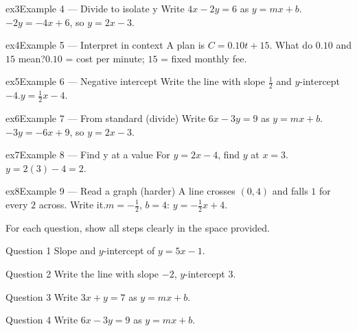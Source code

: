 \documentclass[11pt]{article}
\begin{document}
\begin{example}{ex3}{Example 4 --- Divide to isolate y}
Write $4x-2y=6$ as $y=mx+b$.\soln $-2y=-4x+6$, so $y=2x-3$.
\end{example}

\begin{example}{ex4}{Example 5 --- Interpret in context}
A plan is $C=0.10t+15$. What do $0.10$ and $15$ mean?\soln $0.10$ = cost per minute; $15$ = fixed monthly fee.
\end{example}

\begin{example}{ex5}{Example 6 --- Negative intercept}
Write the line with slope $\tfrac12$ and $y$-intercept $-4$.\soln $y=\tfrac12x-4$.
\end{example}

\begin{example}{ex6}{Example 7 --- From standard (divide)}
Write $6x-3y=9$ as $y=mx+b$.\soln $-3y=-6x+9$, so $y=2x-3$.
\end{example}

\begin{example}{ex7}{Example 8 --- Find y at a value}
For $y=2x-4$, find $y$ at $x=3$.\soln $y=2(3)-4=2$.
\end{example}

\begin{example}{ex8}{Example 9 --- Read a graph (harder)}
A line crosses $(0,4)$ and falls $1$ for every $2$ across. Write it.\soln $m=-\tfrac12$, $b=4$: $y=-\tfrac12x+4$.
\end{example}

\clearpage
{}
For each question, show all steps clearly in the space provided.

\begin{qbox}{Question 1}
Slope and $y$-intercept of $y=5x-1$.\workspace{1.8cm}
\end{qbox}

\begin{qbox}{Question 2}
Write the line with slope $-2$, $y$-intercept $3$.\workspace{1.8cm}
\end{qbox}

\begin{qbox}{Question 3}
Write $3x+y=7$ as $y=mx+b$.\workspace{2.0cm}
\end{qbox}

\begin{qbox}{Question 4}
Write $6x-3y=9$ as $y=mx+b$.\workspace{2.0cm}
\end{qbox}
\end{document}
